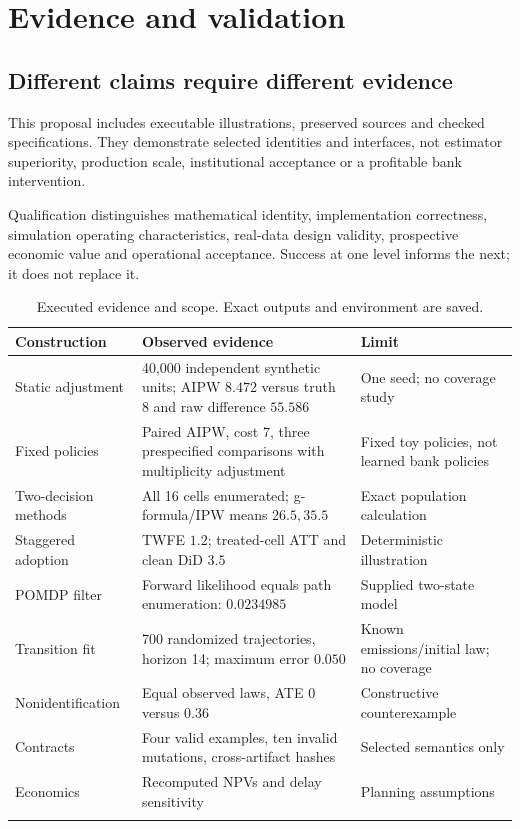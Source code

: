\chapter{Evidence and validation}\label{ch:validation}
\section{Different claims require different evidence}
This proposal includes executable illustrations, preserved sources and
checked specifications. They demonstrate selected identities and interfaces,
not estimator superiority, production scale, institutional acceptance or
a profitable bank intervention.

Qualification distinguishes mathematical identity, implementation
correctness, simulation operating characteristics, real-data design
validity, prospective economic value and operational acceptance.
Success at one level informs the next; it does not replace it.

\begin{longtable}{P{34mm}P{60mm}P{48mm}}
\toprule Construction & Observed evidence & Limit\\\midrule
\endhead
Static adjustment & 40,000 independent synthetic units; AIPW $8.472$ versus truth $8$ and raw difference $55.586$ & One seed; no coverage study\\
Fixed policies & Paired AIPW, cost $7$, three prespecified comparisons with multiplicity adjustment & Fixed toy policies, not learned bank policies\\
Two-decision methods & All 16 cells enumerated; g-formula/IPW means $26.5,35.5$ & Exact population calculation\\
Staggered adoption & TWFE $1.2$; treated-cell ATT and clean DiD $3.5$ & Deterministic illustration\\
POMDP filter & Forward likelihood equals path enumeration: $0.0234985$ & Supplied two-state model\\
Transition fit & 700 randomized trajectories, horizon 14; maximum error $0.050$ & Known emissions/initial law; no coverage\\
Nonidentification & Equal observed laws, ATE $0$ versus $0.36$ & Constructive counterexample\\
Contracts & Four valid examples, ten invalid mutations, cross-artifact hashes & Selected semantics only\\
Economics & Recomputed NPVs and delay sensitivity & Planning assumptions\\
\bottomrule
\caption{Executed evidence and scope. Exact outputs and environment are saved.}
\label{tab:executed}
\end{longtable}

